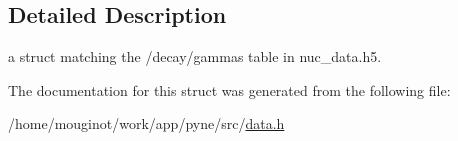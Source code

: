 \subsection{Detailed Description}
a struct matching the \textquotesingle{}/decay/gammas\textquotesingle{} table in nuc\+\_\+data.\+h5. 

The documentation for this struct was generated from the following file\+:\begin{DoxyCompactItemize}
\item 
/home/mouginot/work/app/pyne/src/\hyperlink{data_8h}{data.\+h}\end{DoxyCompactItemize}
